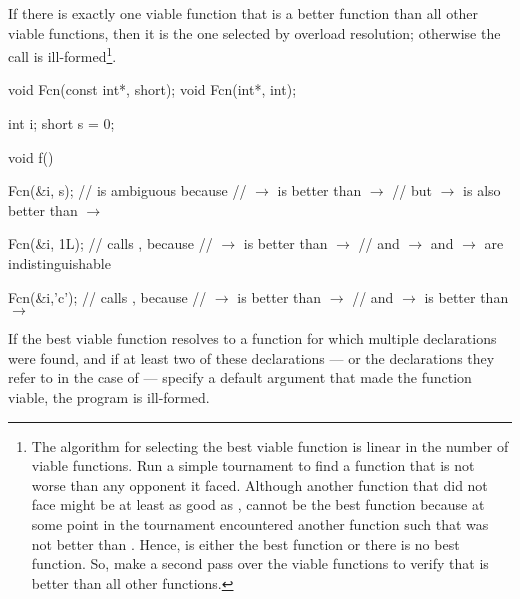 \pnum
If there is exactly one viable function that is a better function
than all other viable functions, then it is the one selected by
overload resolution; otherwise the call is ill-formed\footnote{The algorithm
for selecting the best viable function is linear in the number
of viable
functions.
Run a simple tournament to find a function
that is not
worse than any
opponent it faced.
Although another function
that
did not face
might be at least as good as
,
cannot be the best function because at some point in the
tournament
encountered another function
such that
was not better than
.
Hence,
is either
the best function or there is no best function.
So, make a second pass over
the viable
functions to verify that
is better than all other functions.}.

\enterexample

\begin{codeblock}
void Fcn(const int*,  short);
void Fcn(int*, int);

int i;
short s = 0;

void f() {
  Fcn(&i, s);                   // is ambiguous because
                                //  $\to$  is better than  $\to$ 
                                // but  $\to$  is also better than  $\to$ 

  Fcn(&i, 1L);                  // calls , because
                                //  $\to$  is better than  $\to$ 
                                // and  $\to$  and  $\to$  are indistinguishable

  Fcn(&i,'c');                  // calls , because
                                //  $\to$  is better than  $\to$ 
                                // and  $\to$  is better than  $\to$ 
}
\end{codeblock}
\exitexample

\pnum
If the best viable function resolves to a function for
which multiple declarations were found, and if at least
two of these declarations --- or the declarations they
refer to in the case of
--- specify a default argument that made the function
viable, the program is ill-formed.
\enterexample

